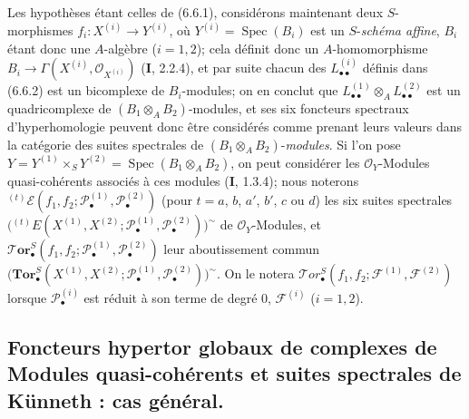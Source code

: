 \begin{env}[6.6.8]
Les hypothèses étant celles de (6.6.1), considérons maintenant deux
$S$-morphismes $f_i:X^{(i)}\to Y^{(i)}$, où
$Y^{(i)}=\operatorname{Spec}(B_i)$ est un $S$-\emph{schéma affine}, $B_i$
étant donc une $A$-algèbre ($i=1,2$); cela définit donc un $A$-homomorphisme
$B_i\to\Gamma(X^{(i)},\mathscr O_{X^{(i)}})$ (\textbf{I}, 2.2.4), et par suite chacun
des $L_{\bullet\bullet}^{(i)}$ définis dans (6.6.2) est un bicomplexe de
$B_i$-modules; on en conclut que
$L_{\bullet\bullet}^{(1)}\otimes_A L_{\bullet\bullet}^{(2)}$ est un
quadricomplexe de $(B_1\otimes_A B_2)$-modules, et ses six foncteurs spectraux
d'hyperhomologie peuvent donc être considérés comme prenant leurs valeurs
dans la catégorie des suites spectrales de $(B_1\otimes_A B_2)$-\emph{modules}. Si
l'on pose
$Y=Y^{(1)}\times_S Y^{(2)}=\operatorname{Spec}(B_1\otimes_A B_2)$, on peut
considérer les $\mathscr O_Y$-Modules quasi-cohérents associés à ces modules
(\textbf{I}, 1.3.4); nous noterons
${}^{(t)}\mathscr E
(f_1,f_2;\mathscr P_\bullet^{(1)},\mathscr P_\bullet^{(2)})$
(pour $t=a$, $b$, $a'$, $b'$, $c$ ou $d$) les six suites spectrales
$
  \bigl({}^{(t)}E
  (X^{(1)},X^{(2)};
   \mathscr P_\bullet^{(1)},\mathscr P_\bullet^{(2)})\bigr)^{\sim}$
de $\mathscr O_Y$-Modules, et
$\boldsymbol{\mathscr{T}\!or}_\bullet^S
(f_1,f_2;\mathscr P_\bullet^{(1)},\mathscr P_\bullet^{(2)})$ leur
aboutissement commun
$
  \bigl(\mathbf{Tor}_\bullet^S
  (X^{(1)},X^{(2)};
   \mathscr P_\bullet^{(1)},\mathscr P_\bullet^{(2)})\bigr)^{\sim}$.
On le notera
$\mathscr{T}\!or_\bullet^S(f_1,f_2;\mathscr F^{(1)},\mathscr F^{(2)})$
lorsque $\mathscr P_\bullet^{(i)}$ est réduit à son terme de degré 0,
$\mathscr F^{(i)}$ ($i=1,2$).
\end{env}

\subsection{Foncteurs hypertor globaux de complexes de Modules quasi-cohérents
et suites spectrales de Künneth : cas général.}

